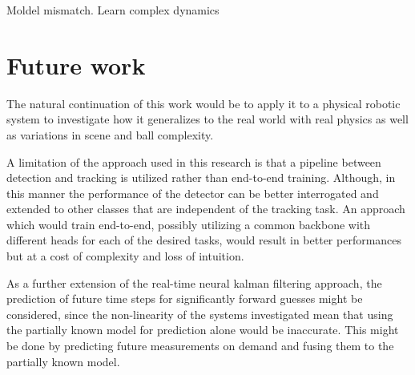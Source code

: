 \documentclass[a4paper,twoside,12pt]{report}
\begin{document}
Moldel mismatch. Learn complex dynamics

\section{Future work}

The natural continuation of this work would be to apply it to a physical robotic system to investigate how it generalizes to the real world with real physics as well as variations in scene and ball complexity.

A limitation of the approach used in this research is that a pipeline between detection and tracking is utilized rather than end-to-end training. Although, in this manner the performance of the detector can be better interrogated and extended to other classes that are independent of the tracking task. An approach which would train end-to-end, possibly utilizing a common backbone with different heads for each of the desired tasks, would result in better performances but at a cost of complexity and loss of intuition.

As a further extension of the real-time neural kalman filtering approach, the prediction of future time steps for significantly forward guesses might be considered, since the non-linearity of the systems investigated mean that using the partially known model for prediction alone would be inaccurate. This might be done by predicting future measurements on demand and fusing them to the partially known model.

%



\end{document}

